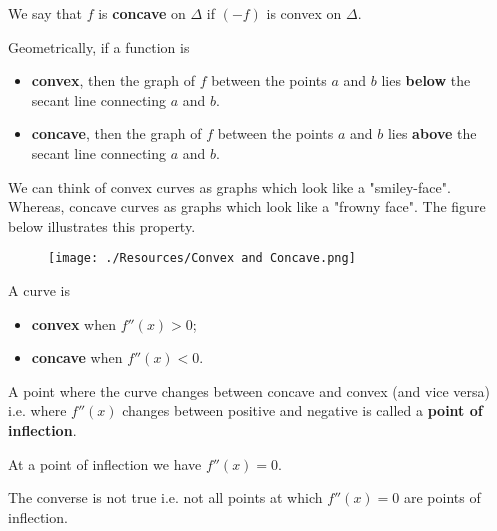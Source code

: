 \documentclass[12pt, a4paper]{article}
\begin{document}
\begin{definition}
    We say that \(f\) is \textbf{concave} on \(\Delta\) if \((-f)\) is convex on \(\Delta\).
\end{definition}

\begin{mdnote}
    Geometrically, if a function is 
    \begin{itemize}
        \item \textbf{convex}, then the graph of \(f\) between the points \(a\) and \(b\) lies \textbf{below} the secant line connecting \(a\) and \(b\).
        \item \textbf{concave}, then the graph of \(f\) between the points \(a\) and \(b\) lies \textbf{above} the secant line connecting \(a\) and \(b\).
    \end{itemize}
\end{mdnote}

We can think of convex curves as graphs which look like a "smiley-face". Whereas, concave curves as graphs which look like a "frowny face". The figure below illustrates this property.

\begin{figure}[H]
    \begin{center}
        \texttt{[image: ./Resources/Convex and Concave.png]}
    \end{center}
\end{figure}

\begin{theorem}
    A curve is 
    \begin{itemize}
        \item \textbf{convex} when \(f''(x)>0\);
        \item \textbf{concave} when \(f''(x)<0\).
    \end{itemize}
\end{theorem}

\begin{definition}
    A point where the curve changes between concave and convex (and vice versa) i.e. where \(f''(x)\) changes between positive and negative is called a \textbf{point of inflection}.
\end{definition}

\begin{theorem}
    At a point of inflection we have \(f''(x)=0\).
\end{theorem}

\begin{mdremark}
    The converse is not true i.e. not all points at which \(f''(x)=0\) are points of inflection.
\end{mdremark}
\end{document}
